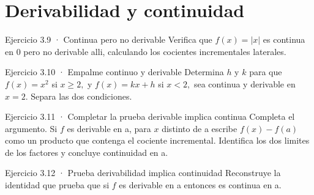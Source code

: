 \documentclass[10pt,a4paper,oneside,openany]{book}
\begin{document}
\section{Derivabilidad y continuidad}
\begin{PSevenExerciseFixed}{Ejercicio 3.9 · Continua pero no derivable}
Verifica que \(f(x)=|x|\) es continua en \(0\) pero no derivable alli, calculando los cocientes incrementales laterales.
\end{PSevenExerciseFixed}
\begin{PSevenExerciseFixed}{Ejercicio 3.10 · Empalme continuo y derivable}
Determina \(h\) y \(k\) para que \(f(x)=x^{2}\) si \(x\ge 2,\) y \(f(x)=kx+h\) si \(x<2,\) sea continua y derivable en \(x=2\). Separa las dos condiciones.
\end{PSevenExerciseFixed}
\begin{PSevenExerciseFixed}{Ejercicio 3.11 · Completar la prueba derivable implica continua}
Completa el argumento. Si \(f\) es derivable en a, para \(x\) distinto de a escribe \(f(x)-f(a)\) como un producto que contenga el cociente incremental. Identifica los dos limites de los factores y concluye continuidad en a.
\end{PSevenExerciseFixed}
\begin{PSevenExerciseFixed}{Ejercicio 3.12 · Prueba derivabilidad implica continuidad}
Reconstruye la identidad que prueba que si \(f\) es derivable en a entonces es continua en a.
\end{PSevenExerciseFixed}
\end{document}
